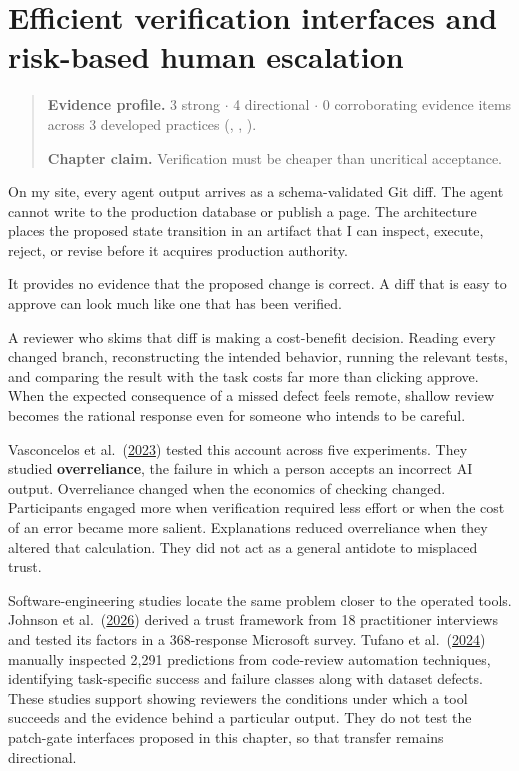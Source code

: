 \chapter{Efficient verification interfaces and risk-based human escalation}
\label{ch16-verification-interfaces-risk-based-escalation}
\begin{quote}
\textbf{Evidence profile.} 3 strong \(\cdot\) 4 directional \(\cdot\) 0 corroborating evidence items across 3 developed practices (, , ).

\textbf{Chapter claim.} Verification must be cheaper than uncritical acceptance.
\end{quote}

On my site, every agent output arrives as a schema-validated Git diff. The agent cannot write to the production database or publish a page. The architecture places the proposed state transition in an artifact that I can inspect, execute, reject, or revise before it acquires production authority.

It provides no evidence that the proposed change is correct. A diff that is easy to approve can look much like one that has been verified.

A reviewer who skims that diff is making a cost-benefit decision. Reading every changed branch, reconstructing the intended behavior, running the relevant tests, and comparing the result with the task costs far more than clicking approve. When the expected consequence of a missed defect feels remote, shallow review becomes the rational response even for someone who intends to be careful.

Vasconcelos et al.~(\href{https://arxiv.org/abs/2212.06823}{2023}) tested this account across five experiments. They studied \textbf{overreliance}, the failure in which a person accepts an incorrect AI output. Overreliance changed when the economics of checking changed. Participants engaged more when verification required less effort or when the cost of an error became more salient. Explanations reduced overreliance when they altered that calculation. They did not act as a general antidote to misplaced trust.

Software-engineering studies locate the same problem closer to the operated tools. Johnson et al.~(\href{https://doi.org/10.1145/3772370}{2026}) derived a trust framework from 18 practitioner interviews and tested its factors in a 368-response Microsoft survey. Tufano et al.~(\href{https://doi.org/10.1109/TSE.2023.3348172}{2024}) manually inspected 2,291 predictions from code-review automation techniques, identifying task-specific success and failure classes along with dataset defects. These studies support showing reviewers the conditions under which a tool succeeds and the evidence behind a particular output. They do not test the patch-gate interfaces proposed in this chapter, so that transfer remains directional.


